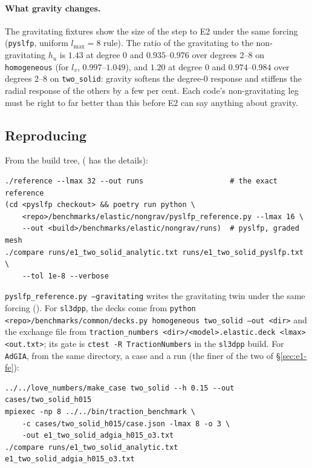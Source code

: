 \documentclass[11pt]{article}
\numberwithin{equation}{section}
\newcommand{\code}[1]{\texttt{#1}}
\begin{document}
\paragraph{What gravity changes.} The gravitating fixtures show the size of
the step to E2 under the same forcing (\code{pyslfp}, uniform
$l_{\max}=8$ rule). The ratio of the gravitating to the non-gravitating
$h_u$ is $1.43$ at degree 0 and $0.935$--$0.976$ over degrees 2--8 on
\code{homogeneous} (for $l_v$, $0.997$--$1.049$), and $1.20$ at degree 0
and $0.974$--$0.984$ over degrees 2--8 on \code{two\_solid}: gravity
softens the degree-0 response and stiffens the radial response of the
others by a few per cent. Each code's non-gravitating leg must be right
to far better than this before E2 can say anything about gravity.

\subsection{Reproducing}
\label{sec:e1-reproduce}

From the build tree, 
( has the details):
\begin{verbatim}
./reference --lmax 32 --out runs                    # the exact reference
(cd <pyslfp checkout> && poetry run python \
    <repo>/benchmarks/elastic/nongrav/pyslfp_reference.py --lmax 16 \
    --out <build>/benchmarks/elastic/nongrav/runs)  # pyslfp, graded mesh
./compare runs/e1_two_solid_analytic.txt runs/e1_two_solid_pyslfp.txt \
    --tol 1e-8 --verbose
\end{verbatim}
\code{pyslfp\_reference.py --gravitating} writes the gravitating twin under
the same forcing (). For \code{sl3dpp}, the
decks come from \code{python <repo>/benchmarks/common/decks.py homogeneous
two\_solid --out <dir>} and the exchange file from \code{traction\_numbers
<dir>/<model>.elastic.deck <lmax> <out.txt>}; its gate is
\code{ctest -R TractionNumbers} in the \code{sl3dpp} build. For \code{AdGIA},
from the same directory, a case and a run (the finer of the two of
\S\ref{sec:e1-fe}):
\begin{verbatim}
../../love_numbers/make_case two_solid --h 0.15 --out cases/two_solid_h015
mpiexec -np 8 ../../bin/traction_benchmark \
    -c cases/two_solid_h015/case.json -lmax 8 -o 3 \
    -out e1_two_solid_adgia_h015_o3.txt
./compare runs/e1_two_solid_analytic.txt e1_two_solid_adgia_h015_o3.txt
\end{verbatim}
\end{document}

